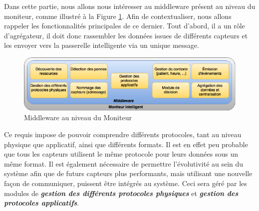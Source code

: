 Dans cette partie, nous allons nous intéresser au middleware présent au niveau du moniteur, comme illustré à la Figure \ref{4}. Afin de contextualiser, nous allons rappeler les fonctionnalités principales de ce dernier. Tout d'abord, il a un rôle d'agrégateur\cite{li2015iot}, il doit donc rassembler les données issues de différents capteurs et les envoyer vers la passerelle intelligente via un unique message. 
\newline
\begin{figure}[h!]
	\hspace*{-3cm}
	\centering
	\includegraphics[width=1.5\textwidth]{Figure4.png}
	\caption{Middleware au niveau du Moniteur}
	\label{4}
\end{figure}

Ce requis impose de pouvoir comprendre différents protocoles, tant au niveau physique que applicatif, ainsi que différents formats. Il est en effet peu probable que tous les capteurs utilisent le même protocole pour leurs données sous un même format. Il est également nécessaire de permettre l'évolutivité au sein du système afin que de futurs capteurs plus performants, mais utilisant une nouvelle façon de communiquer, puissent être intégrés au système. Ceci sera géré par les modules de \textbf{\textit{gestion des différents protocoles physiques}} et \textbf{\textit{gestion des protocoles applicatifs}}.
\newline

